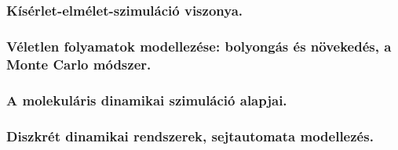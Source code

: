 \subsection{}
\subsubsection{Kísérlet-elmélet-szimuláció viszonya.}

\subsubsection{Véletlen folyamatok modellezése: bolyongás és növekedés, a Monte Carlo módszer.}

\subsubsection{A molekuláris dinamikai szimuláció alapjai.}

\subsubsection{Diszkrét dinamikai rendszerek, sejtautomata modellezés.}
